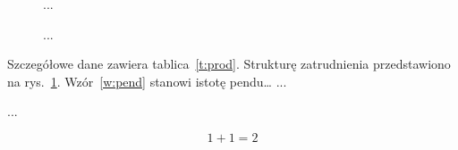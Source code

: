 \documentclass[a4paper]{article}
\begin{document}
\begin{figure} ... \caption{... \label{r:zatr}} \end{figure}

Szczegółowe dane zawiera tablica~\ref{t:prod}. Strukturę zatrudnienia 
przedstawiono na rys.~\ref{r:zatr}. 
Wzór~\ref{w:pend} stanowi istotę pendu\ldots
...
\begin{table} ... \caption{... \label{t:prod}} \end{table}
\begin{equation} 1+1 = 2  \label{w:pend}\end{equation}
\end{document}
